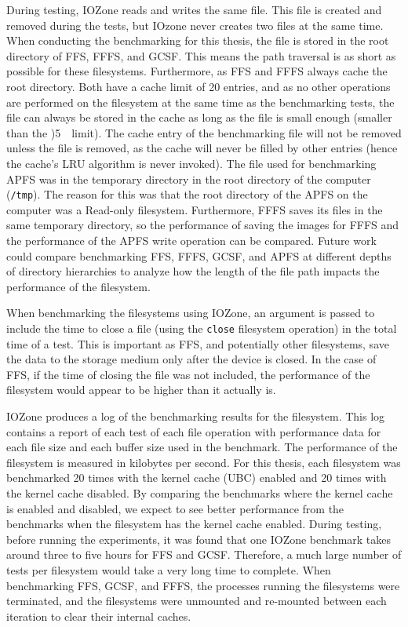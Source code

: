 During testing, IOZone reads and writes the same file. This file is created and removed during the tests, but IOzone never creates two files at the same time. When conducting the benchmarking for this thesis, the file is stored in the root directory of \gls{FFS}, \gls{FFFS}, and \gls{GCSF}. This means the path traversal is as short as possible for these filesystems. Furthermore, as \gls{FFS} and \gls{FFFS} always cache the root directory. Both have a cache limit of 20 entries, and as no other operations are performed on the filesystem at the same time as the benchmarking tests, the file can always be stored in the cache as long as the file is small enough (\ie smaller than the )\SI{5}{\mega\byte}limit). The cache entry of the benchmarking file will not be removed unless the file is removed, as the cache will never be filled by other entries (hence the cache's LRU algorithm is never invoked). The file used for benchmarking \gls{APFS} was in the temporary directory in the root directory of the computer (\ie \texttt{/tmp}). The reason for this was that the root directory of the \gls{APFS} on the computer was a \mbox{Read-only} filesystem. Furthermore, \gls{FFFS} saves its files in the same temporary directory, so the performance of saving the images for \gls{FFFS} and the performance of the \gls{APFS} write operation can be compared. Future work could compare benchmarking \gls{FFS}, \gls{FFFS}, \gls{GCSF}, and \gls{APFS} at different depths of directory hierarchies to analyze how the length of the file path impacts the performance of the filesystem.

When benchmarking the filesystems using IOZone, an argument is passed to include the time to close a file (using the \texttt{close} filesystem operation) in the total time of a test. This is important as \gls{FFS}, and potentially other filesystems, save the data to the storage medium only after the device is closed. In the case of \gls{FFS}, if the time of closing the file was not included, the performance of the filesystem would appear to be higher than it actually is.

IOZone produces a log of the benchmarking results for the filesystem. This log contains a report of each test of each file operation with performance data for each file size and each buffer size used in the benchmark. The performance of the filesystem is measured in kilobytes per second. For this thesis, each filesystem was benchmarked 20 times with the kernel cache (\gls{UBC}) enabled and 20 times with the kernel cache disabled. By comparing the benchmarks where the kernel cache is enabled and disabled, we expect to see better performance from the benchmarks when the filesystem has the kernel cache enabled. During testing, before running the experiments, it was found that one IOZone benchmark takes around three to five hours for \gls{FFS} and \gls{GCSF}. Therefore, a much large number of tests per filesystem would take a very long time to complete. When benchmarking \gls{FFS}, \gls{GCSF}, and \gls{FFFS}, the processes running the filesystems were terminated, and the filesystems were unmounted and \mbox{re-mounted} between each iteration to clear their internal caches.

